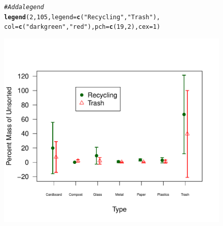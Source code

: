 \documentclass{tufte-handout}\usepackage[]{graphicx}\usepackage[]{color}
\makeatletter
\def\maxwidth{ %
  \ifdim\Gin@nat@width>\linewidth
    \linewidth
  \else
    \Gin@nat@width
  \fi
}
\newcommand{\hlnum}[1]{\textcolor[rgb]{0.686,0.059,0.569}{#1}}%
\newcommand{\hlstr}[1]{\textcolor[rgb]{0.192,0.494,0.8}{#1}}%
\newcommand{\hlcom}[1]{\textcolor[rgb]{0.678,0.584,0.686}{\textit{#1}}}%
\newcommand{\hlstd}[1]{\textcolor[rgb]{0.345,0.345,0.345}{#1}}%
\newcommand{\hlkwc}[1]{\textcolor[rgb]{0.333,0.667,0.333}{#1}}%
\newcommand{\hlkwd}[1]{\textcolor[rgb]{0.737,0.353,0.396}{\textbf{#1}}}%
\newenvironment{kframe}{%
 \def\at@end@of@kframe{}%
 \ifinner\ifhmode%
  \def\at@end@of@kframe{\end{minipage}}%
  \begin{minipage}{\columnwidth}%
 \fi\fi%
 \def\FrameCommand##1{\hskip\@totalleftmargin \hskip-\fboxsep
 \colorbox{shadecolor}{##1}\hskip-\fboxsep
     \hskip-\linewidth \hskip-\@totalleftmargin \hskip\columnwidth}%
 \MakeFramed {\advance\hsize-\width
   \@totalleftmargin\z@ \linewidth\hsize
   \@setminipage}}%
 {\par\unskip\endMakeFramed%
 \at@end@of@kframe}
\newenvironment{knitrout}{}{} %
\makeatother
\begin{document}
\begin{figure}
\begin{knitrout}
\begin{kframe}
\begin{alltt}
\hlcom{# Add a legend}
\hlkwd{legend}\hlstd{(}\hlnum{2}\hlstd{,} \hlnum{105}\hlstd{,} \hlkwc{legend}\hlstd{=}\hlkwd{c}\hlstd{(}\hlstr{"Recycling"}\hlstd{,} \hlstr{"Trash"}\hlstd{),}
       \hlkwc{col}\hlstd{=}\hlkwd{c}\hlstd{(}\hlstr{"darkgreen"}\hlstd{,} \hlstr{"red"}\hlstd{),} \hlkwc{pch}\hlstd{=}\hlkwd{c}\hlstd{(}\hlnum{19}\hlstd{,} \hlnum{2}\hlstd{),} \hlkwc{cex}\hlstd{=}\hlnum{1}\hlstd{)}
\end{alltt}
\end{kframe}
\includegraphics[width=\maxwidth]{figure/unnamed-chunk-15-1} 

\end{knitrout}
\end{figure}
\end{document}
